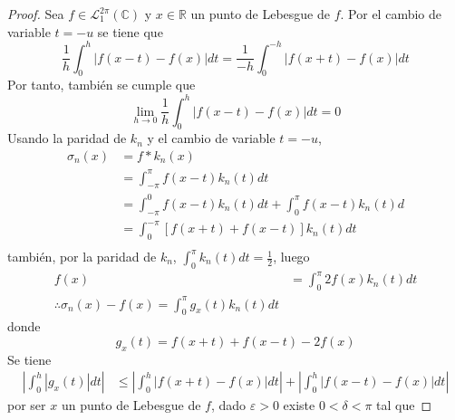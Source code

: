 \documentclass[12pt]{report}
\theoremstyle{largebreak}
\newcommand\abs[1]{\ensuremath{\left|#1\right|}}
\begin{document}
    \begin{proof}
        Sea $f\in\mathcal{L}_1^{2\pi}(\mathbb{C})$ y $x\in\mathbb{R}$ un punto de Lebesgue de $f$. Por el cambio de variable $t=-u$ se tiene que
        \begin{equation*}
            \frac{1}{h}\int_0^h\abs{f(x-t)-f(x)}dt=\frac{1}{-h}\int_0^{-h}\abs{f(x+t)-f(x)}dt
        \end{equation*}
        Por tanto, también se cumple que
        \begin{equation*}
            \lim_{ h\rightarrow0}\frac{1}{h}\int_0^h\abs{f(x-t)-f(x)}dt=0
        \end{equation*}
        Usando la paridad de $k_n$ y el cambio de variable $t=-u$,
        \begin{equation*}
            \begin{split}
                \sigma_n(x)&=f*k_n(x)\\
                &=\int_{-\pi}^{\pi}f(x-t)k_n(t)dt\\
                &=\int_{-\pi}^{0}f(x-t)k_n(t)dt+\int_{0}^{\pi}f(x-t)k_n(t)d\\
                &=\int_{0}^{-\pi}\left[f(x+t)+f(x-t)\right]k_n(t)dt\\
            \end{split}
        \end{equation*}
        también, por la paridad de $k_n$, $\int_{0}^{\pi}k_n(t)dt=\frac{1}{2}$, luego
        \begin{equation*}
            \begin{split}
                f(x)&=\int_0^{\pi}2f(x)k_n(t)dt\\
                \therefore \sigma_n(x)-f(x)=\int_0^{\pi}g_x(t)k_n(t)dt
            \end{split}
        \end{equation*}
        donde
        \begin{equation*}
            g_x(t)=f(x+t)+f(x-t)-2f(x)
        \end{equation*}
        Se tiene
        \begin{equation*}
            \begin{split}
                \abs{\int_0^{h}\abs{g_x(t)}dt}&\leq\abs{\int_0^h\abs{f(x+t)-f(x)}dt}+\abs{\int_0^h\abs{f(x-t)-f(x)}dt}
            \end{split}
        \end{equation*}
        por ser $x$ un punto de Lebesgue de $f$, dado $\varepsilon>0$ existe $0<\delta<\pi$ tal que

\end{proof}
\end{document}
